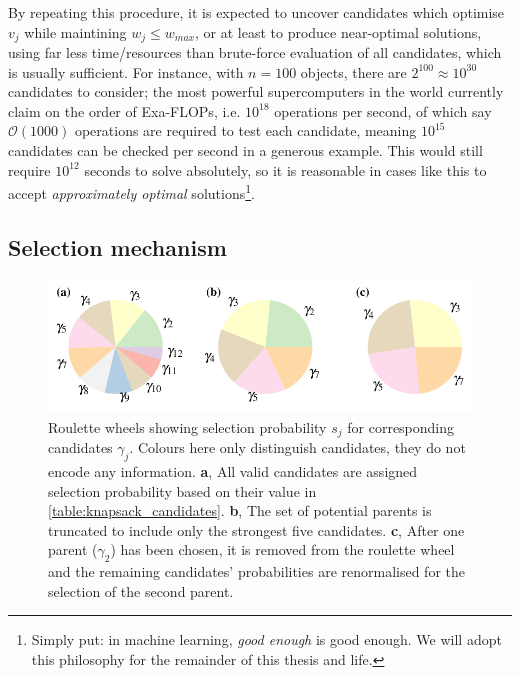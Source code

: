 By repeating this procedure, it is expected to uncover candidates which optimise $v_j$ while maintining $w_j \leq w_{max}$, 
    or at least to produce near-optimal solutions, using far less time/resources than brute-force evaluation of all candidates, 
    which is usually sufficient. 
For instance, with $n=100$ objects, there are $2^{100} \approx 10^{30}$ candidates to consider; 
    the most powerful supercomputers in the world currently claim on the order of Exa-FLOPs, 
    i.e. $10^{18}$ operations per second, of which say $\mathcal{O}(1000)$ operations are required to test each candidate, 
    meaning $10^{15}$ candidates can be checked per second in a generous example. 
This would still require $10^{12}$ seconds to solve absolutely, 
    so it is reasonable in cases like this to accept 
    \emph{approximately optimal} solutions\footnote{
        Simply put: in machine learning, \emph{good enough} is good enough.
        We will adopt this philosophy for the remainder of this thesis and life. 
    }. 


\subsection{Selection mechanism}
\begin{figure}[t]
    \begin{center}
        \includegraphics{theoretical_study/figures/knapsack_roulette.pdf}
    \end{center}
    \caption[Roulette wheels for selection]{
        Roulette wheels showing selection probability $s_j$ for corresponding candidates $\gamma_j$. 
        Colours here only distinguish candidates, they do not encode any information. 
        \textbf{a}, All valid candidates are assigned selection probability based on their value in \cref{table:knapsack_candidates}. 
        \textbf{b}, The set of potential parents is truncated to include only the strongest five candidates. 
        \textbf{c}, After one parent ($\gamma_2$) has been chosen, it is removed from the roulette wheel and the remaining
         candidates' probabilities are renormalised for the selection of the second parent. 
    }
    \label{fig:knapsack_roulette}
\end{figure}

